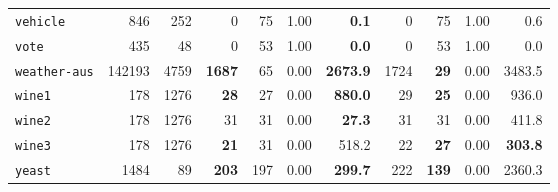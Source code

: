 \begin{tabular}{lccrrrrrrrr}
\texttt{vehicle} & \multicolumn{1}{r}{846} & \multicolumn{1}{r}{252}  & 0 & 75 & 1.00 & \textbf{0.1} & 0 & 75 & 1.00 & 0.6\\
\texttt{vote} & \multicolumn{1}{r}{435} & \multicolumn{1}{r}{48}  & 0 & 53 & 1.00 & \textbf{0.0} & 0 & 53 & 1.00 & 0.0\\
\texttt{weather-aus} & \multicolumn{1}{r}{142193} & \multicolumn{1}{r}{4759}  & \textbf{1687} & 65 & 0.00 & \textbf{2673.9} & 1724 & \textbf{29} & 0.00 & 3483.5\\
\texttt{wine1} & \multicolumn{1}{r}{178} & \multicolumn{1}{r}{1276}  & \textbf{28} & 27 & 0.00 & \textbf{880.0} & 29 & \textbf{25} & 0.00 & 936.0\\
\texttt{wine2} & \multicolumn{1}{r}{178} & \multicolumn{1}{r}{1276}  & 31 & 31 & 0.00 & \textbf{27.3} & 31 & 31 & 0.00 & 411.8\\
\texttt{wine3} & \multicolumn{1}{r}{178} & \multicolumn{1}{r}{1276}  & \textbf{21} & 31 & 0.00 & 518.2 & 22 & \textbf{27} & 0.00 & \textbf{303.8}\\
\texttt{yeast} & \multicolumn{1}{r}{1484} & \multicolumn{1}{r}{89}  & \textbf{203} & 197 & 0.00 & \textbf{299.7} & 222 & \textbf{139} & 0.00 & 2360.3\\
\bottomrule
\end{tabular}
